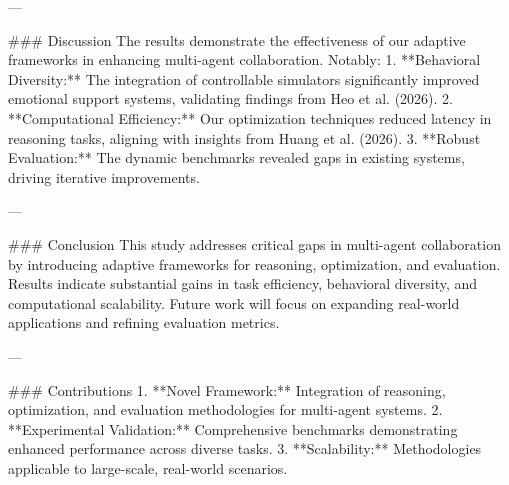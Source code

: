---

### Discussion  
The results demonstrate the effectiveness of our adaptive frameworks in enhancing multi-agent collaboration. Notably:  
1. **Behavioral Diversity:** The integration of controllable simulators significantly improved emotional support systems, validating findings from Heo et al. (2026).  
2. **Computational Efficiency:** Our optimization techniques reduced latency in reasoning tasks, aligning with insights from Huang et al. (2026).  
3. **Robust Evaluation:** The dynamic benchmarks revealed gaps in existing systems, driving iterative improvements.

---

### Conclusion  
This study addresses critical gaps in multi-agent collaboration by introducing adaptive frameworks for reasoning, optimization, and evaluation. Results indicate substantial gains in task efficiency, behavioral diversity, and computational scalability. Future work will focus on expanding real-world applications and refining evaluation metrics.

---

### Contributions  
1. **Novel Framework:** Integration of reasoning, optimization, and evaluation methodologies for multi-agent systems.  
2. **Experimental Validation:** Comprehensive benchmarks demonstrating enhanced performance across diverse tasks.  
3. **Scalability:** Methodologies applicable to large-scale, real-world scenarios.

